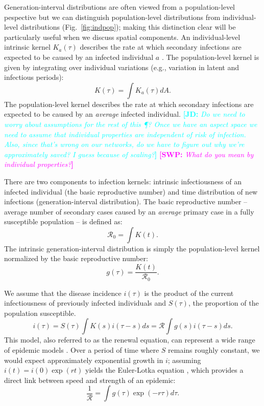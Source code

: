 \documentclass[12pt]{article}
\newcommand{\fref}[1]{Fig.~\ref{fig:#1}}
\newcommand{\RR}{\ensuremath{{\mathcal R}}}
\newcommand{\comment}[3]{\textcolor{#1}{\textbf{[#2: }\textsl{#3}\textbf{]}}}
\newcommand{\jd}[1]{\comment{cyan}{JD}{#1}}
\newcommand{\swp}[1]{\comment{magenta}{SWP}{#1}}
\begin{document}
Generation-interval distributions are often viewed from a population-level pespective but we can distinguish population-level distributions from individual-level distributions (\fref{indpop}); 
making this distinction clear will be particularly useful when we discuss spatial components.
An individual-level intrinsic kernel $K_a(\tau)$ describes the rate at which secondary infections are expected to be caused by an infected individual $a$ \citep{svensson2007note, svensson2015influence}.
The population-level kernel is given by integrating over individual variations (e.g., variation in latent and infectious periods):
\begin{equation}
K(\tau) = \int K_a (\tau) dA.
\end{equation}
The population-level kernel describes the rate at which secondary infections are expected to be caused by an \emph{average} infected individual.
\jd{Do we need to worry about assumptions for the rest of this \P? Once we have an aspect space we need to assume that individual properties are independent of risk of infection. Also, since that's wrong on our networks, do we have to figure out why we're approximately saved? I guess because of scaling?}
\swp{What do you mean by individual properties?}

There are two components to infection kernels: intrinsic infectiousness of an infected individual (the basic reproductive number) and time distribution of new infections (generation-interval distribution).
The basic reproductive number -- average number of secondary cases caused by an \emph{average} primary case in a fully susceptible population -- is defined as: 
\begin{equation}
\RR_0 = \int K(t).
\end{equation}
The intrinsic generation-interval distribution is simply the population-level kernel normalized by the basic reproductive number:
\begin{equation}
g(\tau) = \frac{K(t)}{\RR_0}.
\end{equation}

We assume that the disease incidence $i(\tau)$ is the product of the current infectiousness of previously infected individuals and $S(\tau)$, the proportion of the population susceptible.
\begin{equation}
i(\tau) = S(\tau) \int K(s) i(\tau-s) ds = \RR \int g(s) i(\tau-s) ds.
\end{equation}
This model, also referred to as the renewal equation, can represent a wide range of epidemic models \citep{heesterbeek1996concept, diekmann2000mathematical, roberts2004modelling, aldis2005integral, wallinga2007generation, roberts2007model}.
Over a period of time where $S$ remains roughly constant, we would expect approximately exponential growth in $i$; assuming $i(t) = i(0) \exp(r t)$ yields the Euler-Lotka equation \citep{lotka1907relation}, which provides a direct link between speed and strength of an epidemic:
\begin{equation}
\frac{1}{\RR} = \int g(\tau) \exp(-r \tau) d\tau.
\end{equation}
\end{document}
